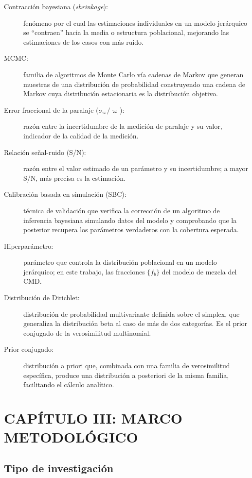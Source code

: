 \documentclass[stu, 12pt, letterpaper, donotrepeattitle, floatsintext, natbib]{apa7_ula}
\begin{document}
\begin{description}
    \item[Contracción bayesiana (\textit{shrinkage}):] fenómeno por
    el cual las estimaciones individuales en un modelo jerárquico se
    ``contraen'' hacia la media o estructura poblacional, mejorando
    las estimaciones de los casos con más ruido.
    \item[MCMC:] familia de algoritmos de Monte Carlo vía cadenas de
    Markov que generan muestras de una distribución de
    probabilidad construyendo una cadena de Markov cuya distribución
    estacionaria es la distribución objetivo.
    \item[Error fraccional de la paralaje ($\sigma_\varpi / \varpi$):]
    razón entre la incertidumbre de la medición de paralaje y su
    valor, indicador de la calidad de la medición.
    \item[Relación señal-ruido (S/N):] razón entre el valor estimado
    de un parámetro y su incertidumbre; a mayor S/N, más precisa es
    la estimación.
    \item[Calibración basada en simulación (SBC):] técnica de
    validación que verifica la corrección de un algoritmo de
    inferencia bayesiana simulando datos del modelo y comprobando
    que la posterior recupera los parámetros verdaderos con la
    cobertura esperada.
    \item[Hiperparámetro:] parámetro que controla la distribución
    poblacional en un modelo jerárquico; en este trabajo, las
    fracciones $\{f_b\}$ del modelo de mezcla del CMD.
    \item[Distribución de Dirichlet:] distribución de probabilidad
    multivariante definida sobre el simplex, que generaliza la
    distribución beta al caso de más de dos categorías. Es el prior
    conjugado de la verosimilitud multinomial.
    \item[Prior conjugado:] distribución a priori que, combinada con
    una familia de verosimilitud específica, produce una distribución
    a posteriori de la misma familia, facilitando el cálculo
    analítico.
\end{description}


\section{CAPÍTULO III: MARCO METODOLÓGICO}

\subsection{Tipo de investigación}
\end{document}
